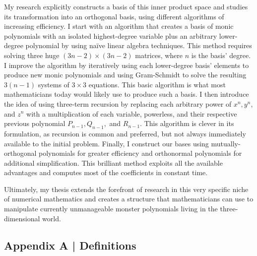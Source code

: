 \documentclass[letterpaper, 12pt]{article}
\begin{document}
My research explicitly constructs a basis of this inner product space and studies its transformation into an orthogonal basis, using different algorithms of increasing efficiency. I start with an algorithm that creates a basis of monic polynomials with an isolated highest-degree variable plus an arbitrary lower-degree polynomial by using na\"ive linear algebra techniques. This method requires solving three huge $(3n-2)\times (3n-2)$ matrices, where $n$ is the basis' degree. I improve the algorithm by iteratively using each lower-degree basis' elements to produce new monic polynomials and using Gram-Schmidt to solve the resulting $3(n-1)$ systems of $3\times 3$ equations. This basic algorithm is what most mathematicians today would likely use to produce such a basis. I then introduce the idea of using three-term recursion by replacing each arbitrary power of $x^n, y^n,$ and $z^n$ with a multiplication of each variable, powerless, and their respective previous polynomial $P_{n-1}, Q_{n-1},$ and $R_{n-1}$. This algorithm is clever in its formulation, as recursion is common and preferred, but not always immediately available to the initial problem. Finally, I construct our bases using mutually-orthogonal polynomials for greater efficiency and orthonormal polynomials for additional simplification. This brilliant method exploits all the available advantages and computes most of the coefficients in constant time.

Ultimately, my thesis extends the forefront of research in this very specific niche of numerical mathematics and creates a structure that mathematicians can use to manipulate currently unmanageable monster polynomials living in the three-dimensional world.  







\newpage
{}
\begin{centering}\section*{Appendix A | Definitions}\end{centering}
\end{document}

